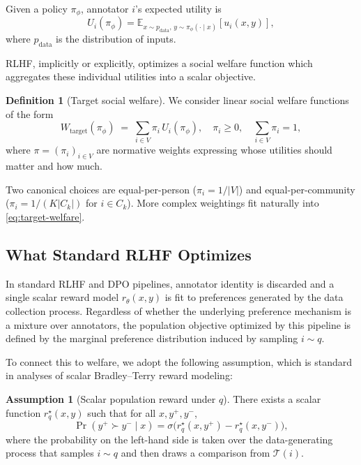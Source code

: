 \documentclass{article}
\theoremstyle{plain}
\theoremstyle{definition}
\newtheorem{definition}[theorem]{Definition}
\newtheorem{assumption}[theorem]{Assumption}
\theoremstyle{remark}
\begin{document}
Given a policy $\pi_\phi$, annotator $i$'s expected utility is
\begin{equation}
    U_i(\pi_\phi)
    =
    \mathbb{E}_{x \sim p_{\text{data}},\, y \sim \pi_\phi(\cdot \mid x)}
    \left[ u_i(x,y) \right],
\end{equation}
where $p_{\text{data}}$ is the distribution of inputs.

RLHF, implicitly or explicitly, optimizes a social welfare function
which aggregates these individual utilities into a scalar objective.

\begin{definition}[Target social welfare]
\label{def:target-welfare}
We consider linear social welfare functions of the form
\begin{equation}
    W_{\text{target}}(\pi_\phi)
    \;=\;
    \sum_{i \in V} \pi_i \, U_i(\pi_\phi),
    \quad
    \pi_i \ge 0,
    \quad
    \sum_{i \in V} \pi_i = 1,
    \label{eq:target-welfare}
\end{equation}
where $\pi = (\pi_i)_{i \in V}$ are normative weights expressing whose
utilities should matter and how much.
\end{definition}

Two canonical choices are equal-per-person ($\pi_i = 1/|V|$) and equal-per-community ($\pi_i = 1/(K|C_k|)$ for $i \in C_k$). More complex weightings fit naturally into \eqref{eq:target-welfare}.

\subsection{What Standard RLHF Optimizes}
\label{subsec:standard-rlhf}

In standard RLHF and DPO pipelines, annotator identity is discarded and a
single scalar reward model $r_\theta(x,y)$ is fit to preferences generated by
the data collection process. Regardless of whether the underlying preference
mechanism is a mixture over annotators, the population objective
optimized by this pipeline is defined by the marginal preference distribution
induced by sampling $i \sim q$.

To connect this to welfare, we adopt the following assumption, which is
standard in analyses of scalar Bradley--Terry reward modeling:

\begin{assumption}[Scalar population reward under $q$]
\label{ass:scalar-q}
There exists a scalar function $r_q^\star(x,y)$ such that for all
$x, y^+, y^-$,
\begin{equation}
    \Pr(y^+ \succ y^- \mid x)
    =
    \sigma\!\big(r_q^\star(x,y^+) - r_q^\star(x,y^-)\big),
    \label{eq:scalar-q-reward}
\end{equation}
where the probability on the left-hand side is taken over the data-generating
process that samples $i \sim q$ and then draws a comparison from
$\mathcal{T}(i)$.
\end{assumption}
\end{document}
